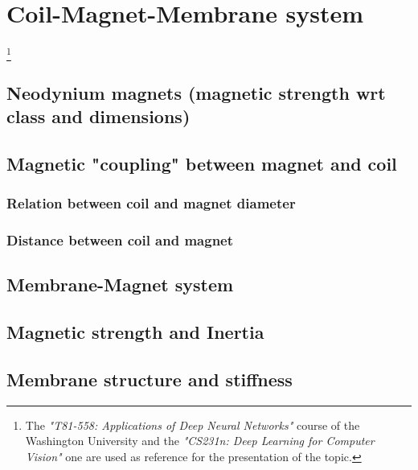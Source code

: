 \section{Coil-Magnet-Membrane system}\footnote{The \textit{"T81-558: Applications of Deep Neural Networks"} course of the Washington University \cite{T81-558} and the \textit{"CS231n: Deep Learning for Computer Vision"}\cite{CS231n} one are used as reference for the presentation of the topic.}

\subsection{Neodynium magnets (magnetic strength wrt class and dimensions)}

\subsection{Magnetic "coupling" between magnet and coil}

\subsubsection{Relation between coil and magnet diameter}

\subsubsection{Distance between coil and magnet}

\subsection{Membrane-Magnet system}

\subsection{Magnetic strength and Inertia}

\subsection{Membrane structure and stiffness}